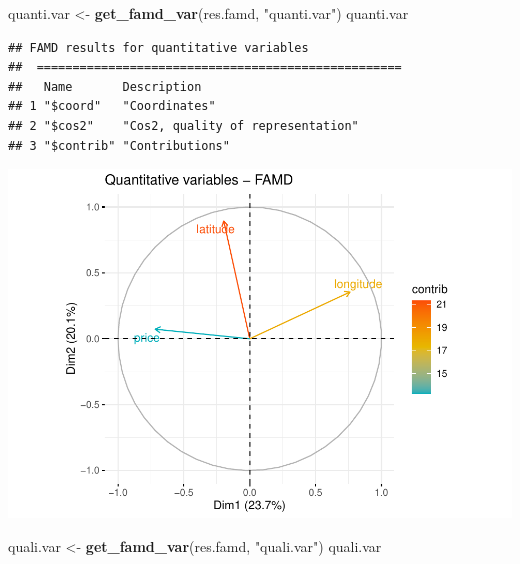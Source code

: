 \documentclass[
]{article}
\newenvironment{Shaded}{\begin{snugshade}}{\end{snugshade}}
\newcommand{\DataTypeTok}[1]{\textcolor[rgb]{0.13,0.29,0.53}{#1}}
\newcommand{\KeywordTok}[1]{\textcolor[rgb]{0.13,0.29,0.53}{\textbf{#1}}}
\newcommand{\NormalTok}[1]{#1}
\newcommand{\OtherTok}[1]{\textcolor[rgb]{0.56,0.35,0.01}{#1}}
\newcommand{\StringTok}[1]{\textcolor[rgb]{0.31,0.60,0.02}{#1}}
\begin{document}
\begin{Shaded}
\begin{Highlighting}[]
\NormalTok{quanti.var <-}\StringTok{ }\KeywordTok{get_famd_var}\NormalTok{(res.famd, }\StringTok{"quanti.var"}\NormalTok{)}
\NormalTok{quanti.var}
\end{Highlighting}
\end{Shaded}

\begin{verbatim}
## FAMD results for quantitative variables 
##  ===================================================
##   Name       Description                      
## 1 "$coord"   "Coordinates"                    
## 2 "$cos2"    "Cos2, quality of representation"
## 3 "$contrib" "Contributions"
\end{verbatim}

\begin{Shaded}
\end{Shaded}

\includegraphics{project-code_files/figure-latex/unnamed-chunk-33-1.pdf}

\begin{Shaded}
\begin{Highlighting}[]
\NormalTok{quali.var <-}\StringTok{ }\KeywordTok{get_famd_var}\NormalTok{(res.famd, }\StringTok{"quali.var"}\NormalTok{)}
\NormalTok{quali.var }
\end{Highlighting}
\end{Shaded}
\end{document}

